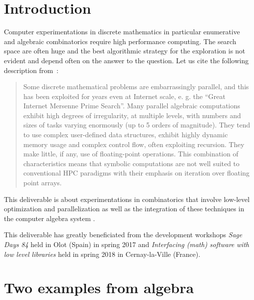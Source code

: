\documentclass{deliverablereport}
\author{V. Delecroix, F. Hivert}
\begin{document}
\maketitle

\tableofcontents


\section{Introduction}

Computer experimentations in discrete mathematics in particular
enumerative and algebraic combinatorics require high performance
computing. The search space are often huge and the best algorithmic
strategy for the exploration is not evident and depend often on
the answer to the question. Let us cite the following description
from~\cite{LoidlTrinder-Hecke}:
\begin{quote}{}
  Some discrete mathematical problems are embarrassingly parallel, and this
  has been exploited for years even at Internet scale, e. g. the “Great
  Internet Mersenne Prime Search”.  Many parallel algebraic computations
  exhibit high degrees of irregularity, at multiple levels, with numbers and
  sizes of tasks varying enormously (up to 5 orders of magnitude). They tend
  to use complex user-defined data structures, exhibit highly dynamic memory
  usage and complex control flow, often exploiting recursion. They make
  little, if any, use of floating-point operations.  This combination of
  characteristics means that symbolic computations are not well suited to
  conventional HPC paradigms with their emphasis on iteration over floating
  point arrays.
\end{quote}

This deliverable is about experimentations in combinatorics
that involve low-level optimization and parallelization as
well as the integration of these techniques in the computer
algebra system \Sage.

This deliverable has greatly beneficiated from the \ODK development
workshops \textit{Sage Days 84} held in Olot (Spain) in spring 2017
and \textit{Interfacing (math) software with low level libraries}
held in spring 2018 in Cernay-la-Ville (France).


\section{Two examples from algebra}
\end{document}
